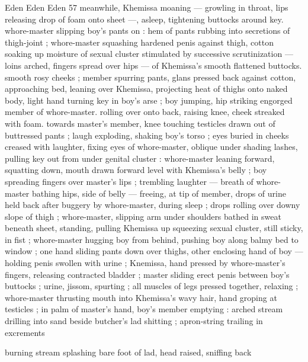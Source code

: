 Eden Eden Eden 57
meanwhile, Khemissa moaning — growling in throat, lips releasing
drop of foam onto sheet —, asleep, tightening buttocks around key.
whore-master slipping boy's pants on : hem of pants rubbing into
secretions of thigh-joint ; whore-master squashing hardened penis
against thigh, cotton soaking up moisture of sexual cluster
stimulated by successive scrutinization — loins arched, fingers
spread over hips — of Khemissa's smooth flattened buttocks.
smooth rosy cheeks ; member spurring pants, glans pressed back
against cotton, approaching bed, leaning over Khemissa, projecting
heat of thighs onto naked body, light hand turning key in boy's arse
; boy jumping, hip striking engorged member of whore-master.
rolling over onto back, raising knee, cheek streaked with foam.
towards master's member, knee touching testicles drawn out of
buttressed pants ; laugh exploding, shaking boy’s torso ; eyes buried
in cheeks creased with laughter, fixing eyes of whore-master, oblique
under shading lashes, pulling key out from under genital cluster :
whore-master leaning forward, squatting down, mouth drawn forward
level with Khemissa's belly ; boy spreading fingers over master's lips
; trembling laughter — breath of whore-master bathing hips, side of
belly — freeing, at tip of member, drops of urine held back after
buggery by whore-master, during sleep ; drops rolling over downy
slope of thigh ; whore-master, slipping arm under shoulders bathed
in sweat beneath sheet, standing, pulling Khemissa up squeezing
sexual cluster, still sticky, in fist ; whore-master hugging boy from
behind, pushing boy along balmy bed to window ; one hand sliding
pants down over thighs, other enclosing hand of boy — holding
penis swollen with urine ; Knemissa, hand pressed by whore-master's
fingers, releasing contracted bladder ; master sliding erect penis
between boy's buttocks ; urine, jissom, spurting ; all muscles of legs
pressed together, relaxing ; whore-master thrusting mouth into
Khemissa’s wavy hair, hand groping at testicles ; in palm of master's
hand, boy's member emptying : arched stream drilling into sand
beside butcher's lad shitting ; apron-string trailing in excrements

burning stream splashing bare foot of lad, head raised, sniffing back

